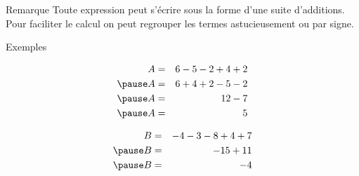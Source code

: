 \documentclass[xcolor={dvipsnames}]{beamer}
\begin{document}
\begin{frame}
	\begin{block}{Remarque}
		Toute expression peut s'écrire sous la forme d'une suite d'additions. \pause Pour faciliter le calcul on peut regrouper les termes astucieusement ou par signe.\pause
	\end{block}

	\begin{exampleblock}{Exemples}
		
		\begin{eqnarray*}
			A &=& 6  -5  -2  +4  +2 \\ \pause
			A &=& 6 + 4 + 2 - 5 - 2 \\ \pause
			A &=& 12 - 7 \\ \pause
			A &=& 5 
		\end{eqnarray*}
	
		\vspace*{-0.75cm}
			
		\begin{eqnarray*}
			B &=& -4  -3  -8  +4  +7 \\ \pause
			B &=& -15 + 11 \\ \pause
			B &=& -4 
		\end{eqnarray*}
	\end{exampleblock}
\end{frame}
\end{document}
